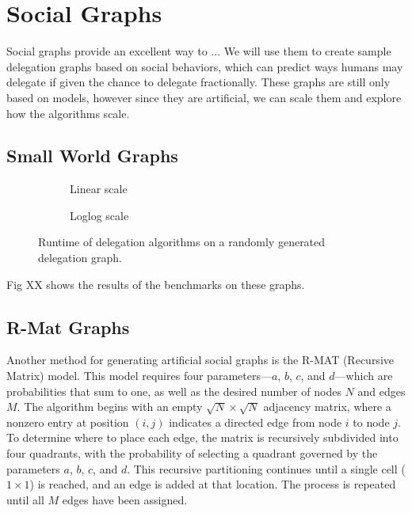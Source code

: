 \section{Social Graphs}

Social graphs provide an excellent way to ... We will use them to create sample delegation graphs based on social behaviors, which can predict ways humans may delegate if given the chance to delegate fractionally. These graphs are still only based on models, however since they are artificial, we can scale them and explore how the algorithms scale.

\subsection{Small World Graphs}


\begin{figure}[t]
    \centering
    \begin{subfigure}[t]{0.45\textwidth}
        \centering
        \caption{Linear scale}
        \label{subfig:small_world_graph_linl}
    \end{subfigure}
    \hfill
    \begin{subfigure}[t]{0.45\textwidth}
        \centering
        \caption{Loglog scale}
        \label{subfig:small_world_graph_loglog}
    \end{subfigure}
    \caption{Runtime of delegation algorithms on a randomly generated delegation graph.}
    \label{fig:small_world_graph}
\end{figure}

Fig XX shows the results of the benchmarks on these graphs. 

\subsection{R-Mat Graphs}

Another method for generating artificial social graphs is the R-MAT (Recursive Matrix) model.  This model requires four parameters—$a$, $b$, $c$, and $d$—which are probabilities that sum to one, as well as the desired number of nodes $N$ and edges $M$. The algorithm begins with an empty $\sqrt{N} \times \sqrt{N}$ adjacency matrix, where a nonzero entry at position $(i, j)$ indicates a directed edge from node $i$ to node $j$. To determine where to place each edge, the matrix is recursively subdivided into four quadrants, with the probability of selecting a quadrant governed by the parameters $a$, $b$, $c$, and $d$. This recursive partitioning continues until a single cell ($1 \times 1$) is reached, and an edge is added at that location. The process is repeated until all $M$ edges have been assigned.




